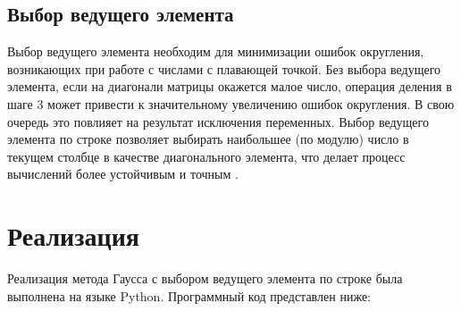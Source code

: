 \subsection*{Выбор ведущего элемента}
Выбор ведущего элемента необходим для минимизации ошибок округления, возникающих при работе с числами с плавающей точкой.  Без выбора ведущего элемента, если на диагонали матрицы окажется малое число, операция деления в шаге 3 может привести к значительному увеличению ошибок округления. В свою очередь это повлияет на результат исключения переменных. Выбор ведущего элемента по строке позволяет выбирать наибольшее (по модулю) число в текущем столбце в качестве диагонального элемента, что делает процесс вычислений более устойчивым и точным \cite{kolobov2008}.


\newpage


\section{Реализация}

Реализация метода Гаусса с выбором ведущего элемента по строке была выполнена на языке Python. Программный код представлен ниже:



